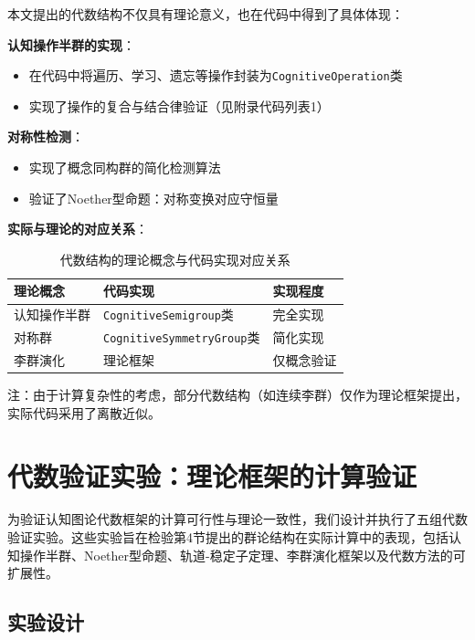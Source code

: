 \documentclass[12pt,a4paper]{article}
\begin{document}
本文提出的代数结构不仅具有理论意义，也在代码中得到了具体体现：

\textbf{认知操作半群的实现}：
\begin{itemize}
\item 在代码中将遍历、学习、遗忘等操作封装为\texttt{CognitiveOperation}类
\item 实现了操作的复合与结合律验证（见附录代码列表1）
\end{itemize}

\textbf{对称性检测}：
\begin{itemize}
\item 实现了概念同构群的简化检测算法
\item 验证了Noether型命题：对称变换对应守恒量
\end{itemize}

\textbf{实际与理论的对应关系}：
\begin{table}[H]
\centering
\caption{代数结构的理论概念与代码实现对应关系}
\label{tab:algebraic_implementation}
\begin{tabular}{p{3.0cm}p{5.0cm}p{2.2cm}}  %
\toprule
\textbf{理论概念} & \textbf{代码实现} & \textbf{实现程度} \\
\midrule
认知操作半群 & \texttt{Cognitive\-Semigroup}类 & 完全实现 \\
对称群 & \texttt{Cognitive\-Symmetry\-Group}类 & 简化实现 \\
李群演化 & 理论框架 & 仅概念验证 \\
\bottomrule
\end{tabular}
\end{table}

注：由于计算复杂性的考虑，部分代数结构（如连续李群）仅作为理论框架提出，实际代码采用了离散近似。

\section{代数验证实验：理论框架的计算验证}
\label{sec:algebraic_experiments}

为验证认知图论代数框架的计算可行性与理论一致性，我们设计并执行了五组代数验证实验。这些实验旨在检验第4节提出的群论结构在实际计算中的表现，包括认知操作半群、Noether型命题、轨道-稳定子定理、李群演化框架以及代数方法的可扩展性。

\subsection{实验设计}
\label{subsec:algebraic_experiment_design}
\end{document}
